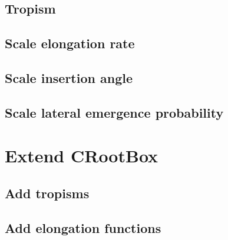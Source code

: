 \documentclass[a4paper]{article}
\begin{document}
\subsection{Tropism}

\subsection{Scale elongation rate}

\subsection{Scale insertion angle}

\subsection{Scale lateral emergence probability}



\section{Extend CRootBox}

\subsection{Add tropisms}

\subsection{Add elongation functions}








\end{document}
